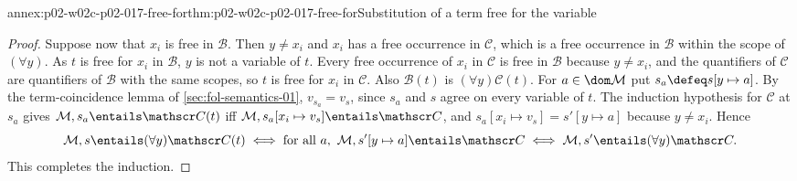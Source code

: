 \begin{annexitem}{annex:p02-w02c-p02-017-free-for}{thm:p02-w02c-p02-017-free-for}{Substitution of a term free for the variable}
\begin{proof}
Suppose now that \(x_i\) is free in \(\mathscr B\).  Then \(y\neq x_i\) and
\(x_i\) has a free occurrence in \(\mathscr C\), which is a free occurrence in
\(\mathscr B\) within the scope of \((\forall y)\).  As \(t\) is free for
\(x_i\) in \(\mathscr B\), \(y\) is not a variable of \(t\).  Every free
occurrence of \(x_i\) in \(\mathscr C\) is free in \(\mathscr B\) because
\(y\neq x_i\), and the quantifiers of \(\mathscr C\) are quantifiers of
\(\mathscr B\) with the same scopes, so \(t\) is free for \(x_i\) in
\(\mathscr C\).  Also \(\mathscr B(t)\) is \((\forall y)\mathscr C(t)\).  For
\(a\in\dom\mathcal M\) put \(s_a\defeq s[y\mapsto a]\).  By the term-coincidence lemma of
\cref{sec:fol-semantics-01}, \(v_{s_a}=v_s\), since \(s_a\) and \(s\)
agree on every variable of \(t\).  The induction hypothesis for \(\mathscr C\)
at \(s_a\) gives
\(\mathcal M,s_a\entails\mathscr C(t)\) iff
\(\mathcal M,s_a[x_i\mapsto v_s]\entails\mathscr C\), and
\(s_a[x_i\mapsto v_s]=s'[y\mapsto a]\) because \(y\neq x_i\).  Hence
\[
 \mathcal M,s\entails(\forall y)\mathscr C(t)
 \iff\text{for all }a,\ \mathcal M,s'[y\mapsto a]\entails\mathscr C
 \iff\mathcal M,s'\entails(\forall y)\mathscr C.
\]
This completes the induction.
\end{proof}
\end{annexitem}

